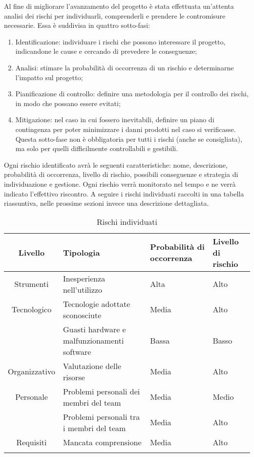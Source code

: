 \documentclass[../PianoProgetto.tex]{subfiles}
\begin{document}
	Al fine di migliorare l’avanzamento del progetto è stata effettuata un’attenta analisi dei rischi per individuarli, comprenderli e prendere le contromisure necessarie. Essa è suddivisa in quattro sotto-fasi:
	\begin{enumerate}
	\item Identificazione: individuare i rischi che possono interessare il progetto, indicandone le cause e cercando di prevedere le conseguenze;
	\item Analisi: stimare la probabilità di occorrenza di un rischio e determinarne l’impatto sul progetto;
	\item Pianificazione di controllo: definire una metodologia per il controllo dei rischi, in modo che possano essere evitati;
	\item Mitigazione: nel caso in cui fossero inevitabili, definire un piano di contingenza per poter minimizzare i danni prodotti nel caso si verificasse. Questa sotto-fase non è obbligatoria per tutti i rischi (anche se consigliata), ma solo per quelli difficilmente controllabili e gestibili.
	\end{enumerate}
	Ogni rischio identificato avrà le seguenti caratteristiche: nome, descrizione, probabilità di occorrenza, livello di rischio, possibili conseguenze e strategia di individuazione e gestione. Ogni rischio verrà monitorato nel tempo e ne verrà indicato l’effettivo riscontro. A seguire i rischi individuati raccolti in una tabella riassuntiva, nelle prossime sezioni invece una descrizione dettagliata.	
		
	
	\begin{longtable}{|c|p{}|p{}|p{}|}
		\hline
		\textbf{Livello} &
		\textbf{Tipologia} &
		\textbf{Probabilità di occorrenza} &
		\textbf{Livello di rischio}
		 \\
			\hline
			Strumenti 	& Inesperienza nell'utilizzo 				& Alta 	& Alto \\
			\hline
			Tecnologico	& Tecnologie adottate sconosciute 			& Media 	& Alto \\
					\cline{2-4}
					& Guasti hardware e malfunzionamenti software 	& Bassa 	& Basso \\
			\hline
			Organizzativo& Valutazione delle risorse					& Media	& Alto \\
			\hline
			Personale	& Problemi personali dei membri del team		& Media	& Medio \\
					\cline{2-4}
					& Problemi personali tra i membri del team		& Media	& Alto \\
			\hline
			Requisiti	& Mancata comprensione					& Media	& Alto \\
			\hline
	\caption{Rischi individuati}
	\end{longtable}
\end{document}

